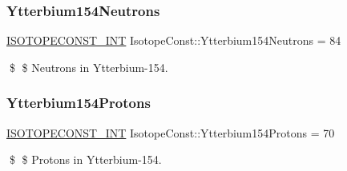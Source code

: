 \subsubsection{\texorpdfstring{Ytterbium154\+Neutrons}{Ytterbium154Neutrons}}
{\footnotesize\ttfamily \mbox{\hyperlink{group___isotope_const-_macros_ga5f18360b3e99483a35c32d789e62621c}{I\+S\+O\+T\+O\+P\+E\+C\+O\+N\+S\+T\+\_\+\+I\+NT}} Isotope\+Const\+::\+Ytterbium154\+Neutrons = 84}

\$ \$ Neutrons in Ytterbium-\/154. \mbox{\label{group___isotope_const-_ytterbium-_yb154_gabeea8f829a1fb734274b865f09216ad9}} 
\subsubsection{\texorpdfstring{Ytterbium154\+Protons}{Ytterbium154Protons}}
{\footnotesize\ttfamily \mbox{\hyperlink{group___isotope_const-_macros_ga5f18360b3e99483a35c32d789e62621c}{I\+S\+O\+T\+O\+P\+E\+C\+O\+N\+S\+T\+\_\+\+I\+NT}} Isotope\+Const\+::\+Ytterbium154\+Protons = 70}

\$ \$ Protons in Ytterbium-\/154. 